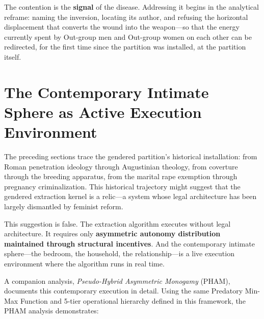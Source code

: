 The contention is the \textbf{signal} of the disease. Addressing it begins in the analytical reframe: naming the inversion, locating its author, and refusing the horizontal displacement that converts the wound into the weapon---so that the energy currently spent by Out-group men and Out-group women on each other can be redirected, for the first time since the partition was installed, at the partition itself.

\section{The Contemporary Intimate Sphere as Active Execution Environment}

The preceding sections trace the gendered partition's historical installation: from Roman penetration ideology through Augustinian theology, from coverture through the breeding apparatus, from the marital rape exemption through pregnancy criminalization. This historical trajectory might suggest that the gendered extraction kernel is a relic---a system whose legal architecture has been largely dismantled by feminist reform.

This suggestion is false. The extraction algorithm executes without legal architecture. It requires only \textbf{asymmetric autonomy distribution maintained through structural incentives}. And the contemporary intimate sphere---the bedroom, the household, the relationship---is a live execution environment where the algorithm runs in real time.

A companion analysis, \textit{Pseudo-Hybrid Asymmetric Monogamy} (PHAM), documents this contemporary execution in detail. Using the same Predatory Min-Max Function and 5-tier operational hierarchy defined in this framework, the PHAM analysis demonstrates:

